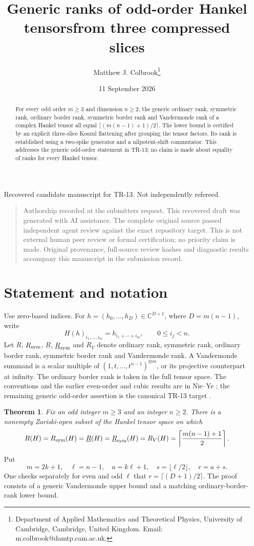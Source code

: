 \documentclass[11pt]{article}
\title{Generic ranks of odd-order Hankel tensors\newline from three compressed slices}
\author{Matthew J. Colbrook\thanks{Department of Applied Mathematics and Theoretical Physics, University of Cambridge, Cambridge, United Kingdom. Email: m.colbrook@damtp.cam.ac.uk.}}
\date{11 September 2026}
\newtheorem{theorem}{Theorem}
\newcommand{\C}{\mathbb C}
\newcommand{\brk}{\underline{R}}
\begin{document}
\maketitle
\begin{center}\small Recovered candidate manuscript for TR-13. Not independently refereed.\end{center}
\begin{quote}\small Authorship recorded at the submitter\textquotesingle s request. This recovered draft was generated with AI assistance. The complete original source passed independent agent review against the exact repository target. This is not external human peer review or formal certification; no priority claim is made. Original provenance, full-source review hashes and diagnostic results accompany this manuscript in the submission record.\end{quote}
\begin{abstract}
For every odd order $m\ge3$ and dimension $n\ge2$, the generic ordinary
rank, symmetric rank, ordinary border rank, symmetric border rank and
Vandermonde rank of a complex Hankel tensor all equal
$\lceil(m(n-1)+1)/2\rceil$. The lower bound is certified by an explicit
three-slice Koszul flattening after grouping the tensor factors. Its rank
is established using a two-spike generator and a nilpotent-shift
commutator. This addresses the generic odd-order statement in TR-13; no
claim is made about equality of ranks for every Hankel tensor.
\end{abstract}

\section{Statement and notation}
Use zero-based indices. For $h=(h_0,\ldots,h_D)\in\C^{D+1}$, where
$D=m(n-1)$, write
\[
 H(h)_{i_1,\ldots,i_m}=h_{i_1+\cdots+i_m},
 \qquad 0\le i_j<n.
\]
Let $R$, $R_{\rm sym}$, $\brk$, $\brk_{\rm sym}$ and $R_V$ denote ordinary
rank, symmetric rank, ordinary border rank, symmetric border rank and
Vandermonde rank. A Vandermonde summand is a scalar multiple of
$(1,t,\ldots,t^{n-1})^{\otimes m}$, or its projective counterpart at
infinity. The ordinary border rank is taken in the full tensor space.
The conventions and the earlier even-order and cubic results are in
Nie--Ye \cite{NY}; the remaining generic odd-order assertion is the
canonical TR-13 target \cite{repo}.

\begin{theorem}\label{thm:main}
Fix an odd integer $m\ge3$ and an integer $n\ge2$. There is a nonempty
Zariski-open subset of the Hankel tensor space on which
\[
 R(H)=R_{\rm sym}(H)=\brk(H)=\brk_{\rm sym}(H)=R_V(H)
 =\left\lceil\frac{m(n-1)+1}{2}\right\rceil.
\]
\end{theorem}
Put
\[
 m=2k+1,\quad \ell=n-1,\quad a=k\ell+1,\quad
 s=\lfloor\ell/2\rfloor,\quad r=a+s.
\]
One checks separately for even and odd $\ell$ that
$r=\lceil(D+1)/2\rceil$. The proof consists of a generic Vandermonde upper
bound and a matching ordinary-border-rank lower bound.
\end{document}
